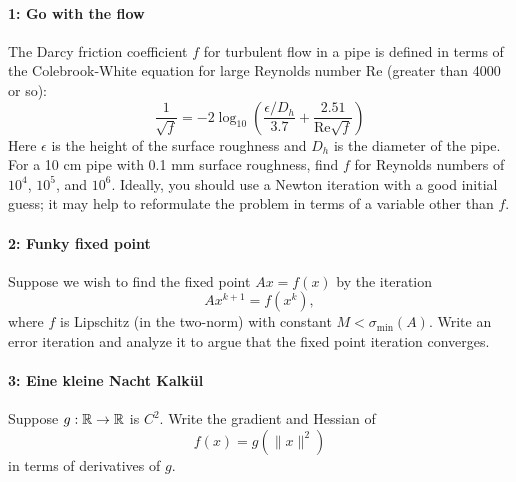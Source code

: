 \documentclass[12pt, leqno]{article}
\begin{document}

%
\paragraph*{1: Go with the flow}
The Darcy friction coefficient $f$ for turbulent flow in a pipe is
defined in terms of the Colebrook-White equation for large Reynolds
number Re (greater than 4000 or so):
\[
\frac{1}{\sqrt{f}} =
  -2 \log_{10} \left( \frac{\epsilon/D_h}{3.7} +
  \frac{2.51}{\mathrm{Re} \sqrt{f}} \right)
\]
Here $\epsilon$ is the height of the surface roughness and $D_h$ is the
diameter of the pipe. For a 10 cm pipe with 0.1 mm surface roughness,
find $f$ for Reynolds numbers of $10^4$, $10^5$, and $10^6$.
Ideally, you should use a Newton iteration with a good initial guess;
it may help to reformulate the problem in terms of a variable other
than $f$.

%
\paragraph*{2: Funky fixed point}
Suppose we wish to find the fixed point $Ax = f(x)$ by the iteration
\[
  A x^{k+1} = f(x^k),
\]
where $f$ is Lipschitz (in the two-norm) with
constant $M < \sigma_{\min}(A)$.  Write an error iteration
and analyze it to argue that the fixed point iteration converges.

%
\paragraph*{3: Eine kleine Nacht Kalk\"ul}
Suppose $g : \mathbb{R} \rightarrow \mathbb{R}$ is $C^2$.
Write the gradient and Hessian of
\[
  f(x) = g(\|x\|^2)
\]
in terms of derivatives of $g$.
\end{document}
